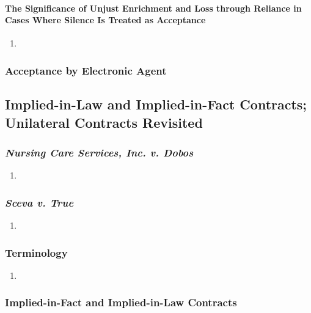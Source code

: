 \paragraph{The Significance of Unjust Enrichment and Loss through Reliance in 
Cases Where Silence Is Treated as Acceptance}

\begin{enumerate}
    \item %
\end{enumerate}

\subsubsection{Acceptance by Electronic Agent}


\subsection{Implied-in-Law and Implied-in-Fact Contracts; Unilateral Contracts 
Revisited}

\subsubsection{\emph{Nursing Care Services, Inc. v. Dobos}}

\begin{enumerate}
    \item %
\end{enumerate}

\subsubsection{\emph{Sceva v. True}}

\begin{enumerate}
    \item %
\end{enumerate}

\subsubsection{Terminology}

\begin{enumerate}
    \item %
\end{enumerate}

\subsubsection{Implied-in-Fact and Implied-in-Law Contracts}

